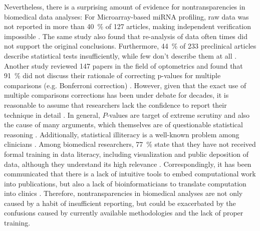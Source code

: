 Nevertheless, there is a surprising amount of evidence for nontransparencies in
biomedical data analyses: For Microarray-based miRNA profiling, raw data was not
reported in more than \SI{40}{\percent} of 127 articles, making independent
verification impossible \cite{witwerDataSubmissionQuality2013}. The same study
also found that re-analysis of data often times did not support the original
conclusions. Furthermore, \SI{44}{\percent} of 233 preclinical articles describe
statistical tests insufficiently, while few don't describe them at all
\cite{gosselinInsufficientTransparencyStatistical2021}. Another study reviewed
147 papers in the field of optometrics and found that \SI{91}{\percent} did not
discuss their rationale of correcting p-values for multiple comparisons (e.g.
Bonferroni correction) \cite{armstrongWhenUseBonferroni2014}. However, given
that the exact use of multiple comparisons corrections has been under debate for
decades, it is reasonable to assume that researchers lack the confidence to
report their technique in detail \cite{pernegerWhatWrongBonferroni1998,
    moranArgumentsRejectingSequential2003, sullivanFactsFictionsHandling2021}. In
general, $P$-values are target of extreme scrutiny and also the cause of many
arguments, which themselves are of questionable statistical reasoning%
%
\cite{leekStatisticsValuesAre2015}. Additionally, statistical illiteracy is a
well-known problem among clinicians
\cite{lakhlifiIllusionKnowledgeStatistics2023}. Among biomedical researchers,
\SI{77}{\percent} state that they have not received formal training in data
literacy, including visualization and public deposition of data, although they
understand its high relevance \cite{federerDataLiteracyTraining2016}.
Correspondingly, it has been communicated that there is a lack of intuitive
tools to embed computational work into publications, but also a lack of
bioinformaticians to translate computation into clinics
\cite{mesirovAccessibleReproducibleResearch2010, smithJournalOpenSource2018,gomez-lopezPrecisionMedicineNeeds2019}.
Therefore, nontransparencies in biomedical analyses are not only caused by a
habit%
%
of insufficient reporting, but could be exacerbated by the confusions caused
by currently available methodologies and the lack of proper training.



